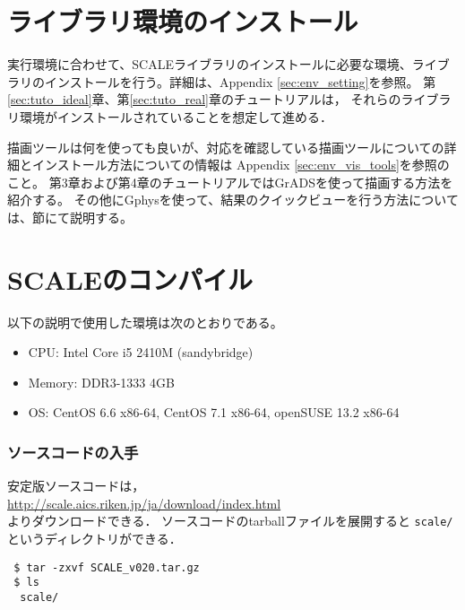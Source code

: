 \section{ライブラリ環境のインストール}
\label{sec:inst_env}
実行環境に合わせて、SCALEライブラリのインストールに必要な環境、ライブラリのインストールを行う。詳細は、Appendix \ref{sec:env_setting}を参照。
第\ref{sec:tuto_ideal}章、第\ref{sec:tuto_real}章のチュートリアルは，
それらのライブラリ環境がインストールされていることを想定して進める．

描画ツールは何を使っても良いが、対応を確認している描画ツールについての詳細とインストール方法についての情報は
Appendix \ref{sec:env_vis_tools}を参照のこと。
第3章および第4章のチュートリアルではGrADSを使って描画する方法を紹介する。
その他にGphysを使って、結果のクイックビューを行う方法については、\label{sec:quicklook}節にて説明する。



\section{SCALEのコンパイル} \label{sec:source_code}


以下の説明で使用した環境は次のとおりである。
\begin{itemize}
\item CPU: Intel Core i5 2410M (sandybridge)
\item Memory: DDR3-1333 4GB
\item OS: CentOS 6.6 x86-64, CentOS 7.1 x86-64, openSUSE 13.2 x86-64
\end{itemize}

\subsubsection{ソースコードの入手}
安定版ソースコードは，\\
 \url{http://scale.aics.riken.jp/ja/download/index.html}\\
よりダウンロードできる．
ソースコードのtarballファイルを展開すると
\verb|scale/|というディレクトリができる．
\begin{verbatim}
 $ tar -zxvf SCALE_v020.tar.gz
 $ ls
  scale/
\end{verbatim}



